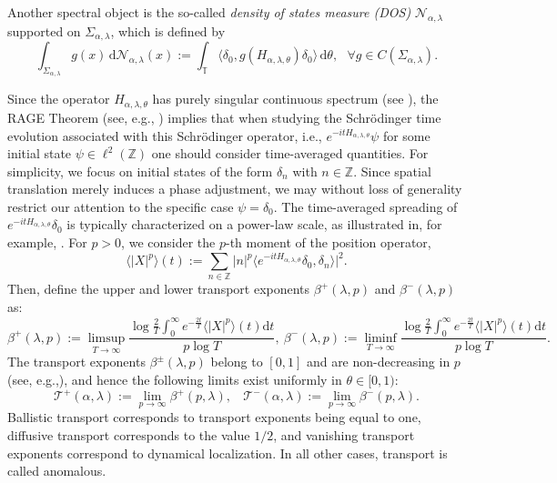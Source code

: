 \documentclass[reqno,11pt,graphicx,]{amsart}
\numberwithin{equation}{section}
\theoremstyle{plain}
\newcommand{\3}{\mathbf{3}}
\begin{document}
	Another spectral object  is the so-called {\it density of states measure (DOS)} $\mathcal{N}_{\alpha,\lambda}$ supported on $\Sigma_{\alpha,\lambda}$, which is defined by
	\begin{equation*}\label{def-dos}
		\int_{\Sigma_{\alpha,\lambda}} g(x)\,\mathrm{d} \mathcal{N}_{\alpha,\lambda}(x):=\int_{\mathbb T}\langle \delta_0,g(H_{\alpha,\lambda,\theta})\delta_0\rangle\,\mathrm{d}\theta, \ \ \ \forall g\in C(\Sigma_{\alpha,\lambda}).
	\end{equation*}
	
	Since the operator $H_{\alpha,\lambda,\theta}$ has purely singular continuous spectrum (see \cite{DKL2000}), the RAGE Theorem (see, e.g., \cite[Theorem XI.115]{RS1979}) implies that when studying the Schr\"odinger time evolution associated with this Schr\"odinger operator, i.e., $e^{-itH_{\alpha,\lambda,\theta}} \psi$ for some initial state $\psi \in \ell^2(\mathbb{Z})$ one should consider time-averaged quantities. For simplicity, we focus on initial states of the form $\delta_n$ with $n \in \mathbb{Z}$. Since spatial translation merely induces a phase adjustment, we may without loss of generality restrict our attention to the specific case $\psi = \delta_0$. The time-averaged spreading of $e^{-itH_{\alpha,\lambda,\theta}} \delta_0$ is typically characterized on a power-law scale, as illustrated in, for example, \cite{La1996,DT2010}. For $ p > 0$, we consider the $ p$-th moment of the position operator,
	\begin{equation*}
		\langle |X|^p\rangle(t):=\sum_{n\in{\mathbb{Z}}}|n|^p\langle
		e^{-itH_{\alpha,\lambda,\theta}}\delta_0,\delta_n\rangle|^2.
	\end{equation*}
	Then, define the upper and lower transport exponents $\beta
	^+(\lambda,p)$ and $\beta^-(\lambda,p)$ as:
	\begin{equation*}
		\beta^+(\lambda,p):=\limsup\limits_{T\to\infty}\dfrac{
			\log\frac{2}{T}\int_{0}^{\infty}e^{-\frac{2t}{T}}\langle|X|^p\rangle(t)\mathrm{d}t}{p\log T},\
		\beta
		^-(\lambda,p):=\liminf\limits_{T\to\infty}\dfrac{\log\frac{2}{T}\int_{0}^{\infty}e^{-\frac{2t}{T}}\langle|X|^p\rangle(t)\mathrm{d}t}{p\log T}.
	\end{equation*}
	The transport exponents $\beta^{\pm}(\lambda,p)$ belong to $[0,1]$
	and are non-decreasing in $p$ (see, e.g.,\cite{DT2010}), and hence the
	following limits exist uniformly in $\theta\in[0,1)$: 
	\begin{equation*}
		\mathcal{T}^{+}(\alpha,\lambda):=\lim\limits_{p%
			\to\infty}\beta^{+}(p,\lambda),\ \ \ \ 	\mathcal{T}^{-}(\alpha,\lambda):=\lim\limits_{p%
			\to\infty}\beta^{-}(p,\lambda). 
	\end{equation*} 
	Ballistic transport corresponds to transport exponents being equal to one, diffusive
	transport corresponds to the value $1/2$, and vanishing transport exponents correspond to dynamical localization. In all other cases, transport is called anomalous.
	
\end{document}
